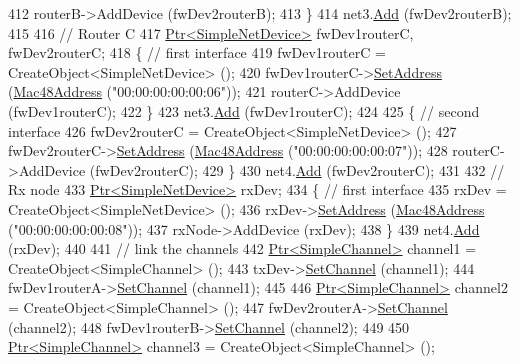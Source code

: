 \begin{DoxyCode}
412     routerB->AddDevice (fwDev2routerB);
413   \}
414   net3.\hyperlink{classns3_1_1NetDeviceContainer_a7ca8bc1d7ec00fd4fcc63869987fbda5}{Add} (fwDev2routerB);
415 
416   \textcolor{comment}{// Router C}
417   \hyperlink{classns3_1_1Ptr}{Ptr<SimpleNetDevice>} fwDev1routerC, fwDev2routerC;
418   \{ \textcolor{comment}{// first interface}
419     fwDev1routerC = CreateObject<SimpleNetDevice> ();
420     fwDev1routerC->\hyperlink{classns3_1_1SimpleNetDevice_a968ef3e7318bac29d5f1d7d977029af4}{SetAddress} (\hyperlink{classns3_1_1Mac48Address}{Mac48Address} (\textcolor{stringliteral}{"00:00:00:00:00:06"}));
421     routerC->AddDevice (fwDev1routerC);
422   \}
423   net3.\hyperlink{classns3_1_1NetDeviceContainer_a7ca8bc1d7ec00fd4fcc63869987fbda5}{Add} (fwDev1routerC);
424 
425   \{ \textcolor{comment}{// second interface}
426     fwDev2routerC = CreateObject<SimpleNetDevice> ();
427     fwDev2routerC->\hyperlink{classns3_1_1SimpleNetDevice_a968ef3e7318bac29d5f1d7d977029af4}{SetAddress} (\hyperlink{classns3_1_1Mac48Address}{Mac48Address} (\textcolor{stringliteral}{"00:00:00:00:00:07"}));
428     routerC->AddDevice (fwDev2routerC);
429   \}
430   net4.\hyperlink{classns3_1_1NetDeviceContainer_a7ca8bc1d7ec00fd4fcc63869987fbda5}{Add} (fwDev2routerC);
431 
432   \textcolor{comment}{// Rx node}
433   \hyperlink{classns3_1_1Ptr}{Ptr<SimpleNetDevice>} rxDev;
434   \{ \textcolor{comment}{// first interface}
435     rxDev = CreateObject<SimpleNetDevice> ();
436     rxDev->\hyperlink{classns3_1_1SimpleNetDevice_a968ef3e7318bac29d5f1d7d977029af4}{SetAddress} (\hyperlink{classns3_1_1Mac48Address}{Mac48Address} (\textcolor{stringliteral}{"00:00:00:00:00:08"}));
437     rxNode->AddDevice (rxDev);
438   \}
439   net4.\hyperlink{classns3_1_1NetDeviceContainer_a7ca8bc1d7ec00fd4fcc63869987fbda5}{Add} (rxDev);
440 
441   \textcolor{comment}{// link the channels}
442   \hyperlink{classns3_1_1Ptr}{Ptr<SimpleChannel>} channel1 = CreateObject<SimpleChannel> ();
443   txDev->\hyperlink{classns3_1_1SimpleNetDevice_af9e9828ad584b5ba538f18f645f162e0}{SetChannel} (channel1);
444   fwDev1routerA->\hyperlink{classns3_1_1SimpleNetDevice_af9e9828ad584b5ba538f18f645f162e0}{SetChannel} (channel1);
445 
446   \hyperlink{classns3_1_1Ptr}{Ptr<SimpleChannel>} channel2 = CreateObject<SimpleChannel> ();
447   fwDev2routerA->\hyperlink{classns3_1_1SimpleNetDevice_af9e9828ad584b5ba538f18f645f162e0}{SetChannel} (channel2);
448   fwDev1routerB->\hyperlink{classns3_1_1SimpleNetDevice_af9e9828ad584b5ba538f18f645f162e0}{SetChannel} (channel2);
449 
450   \hyperlink{classns3_1_1Ptr}{Ptr<SimpleChannel>} channel3 = CreateObject<SimpleChannel> ();

\end{DoxyCode}
